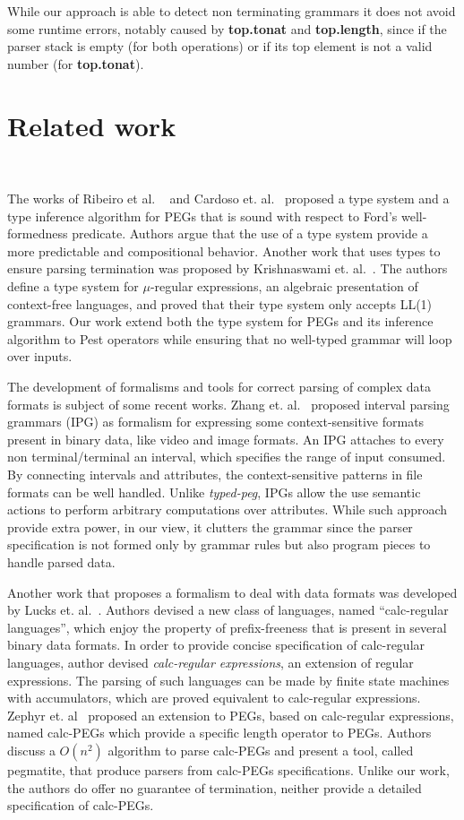 \documentclass[preprint,12pt]{elsarticle}
\theoremstyle{definition}
\begin{document}
While our approach is able to detect non terminating grammars it does not avoid
some runtime errors, notably caused by \textbf{top.tonat} and \textbf{top.length},
since if the parser stack is empty (for both operations) or if its top element is
not a valid number (for \textbf{top.tonat}).

\section{Related work}~\label{sec:related}

The works of Ribeiro et al. ~\cite{Ribeiro19} and Cardoso et. al.~\cite{Cardoso23}
proposed a type system and a type inference algorithm for PEGs that is sound with
respect to Ford's well-formedness predicate. Authors argue that the use
of a type system provide a more predictable and compositional behavior.
Another work that uses types to ensure parsing termination was proposed by
Krishnaswami et. al.~\cite{Krishnaswami19}. The authors define a type system
for $\mu$-regular expressions, an algebraic presentation of context-free
languages, and proved that their type system only accepts LL(1) grammars.
Our work extend both the type system for PEGs and its inference algorithm to
Pest operators while ensuring that no well-typed grammar
will loop over inputs.

The development of formalisms and tools for correct parsing of complex data
formats is subject of some recent works.  Zhang et. al.~\cite{Zhang23} proposed
interval parsing grammars (IPG) as formalism for expressing some context-sensitive
formats present in binary data, like video and image formats. An IPG attaches to
every non terminal/terminal an interval, which specifies the range of input consumed.
By connecting intervals and attributes, the context-sensitive patterns in file formats
can be well handled. Unlike \emph{typed-peg}, IPGs allow the use semantic actions to
perform arbitrary computations over attributes. While such approach provide extra
power, in our view, it clutters the grammar since the parser specification is not formed only by
grammar rules but also program pieces to handle parsed data.

Another work that proposes a formalism to deal with data formats was developed by Lucks
et. al.~\cite{Lucks17}. Authors devised a new class of languages, named
``calc-regular languages'', which enjoy the property of prefix-freeness that is
present in several binary data formats. In order to provide concise specification
of calc-regular languages, author devised \emph{calc-regular expressions}, an
extension of regular expressions. The parsing of such languages can be made by
finite state machines with accumulators, which are proved equivalent to calc-regular
expressions. Zephyr et. al~\cite{Zephyr21} proposed an extension to PEGs, based on
calc-regular expressions, named calc-PEGs which provide a specific length
operator to PEGs. Authors discuss a $O(n^2)$ algorithm to parse calc-PEGs and
present a tool, called pegmatite, that produce parsers from calc-PEGs specifications.
Unlike our work, the authors do offer no guarantee of termination, neither provide
a detailed specification of calc-PEGs.
\end{document}
